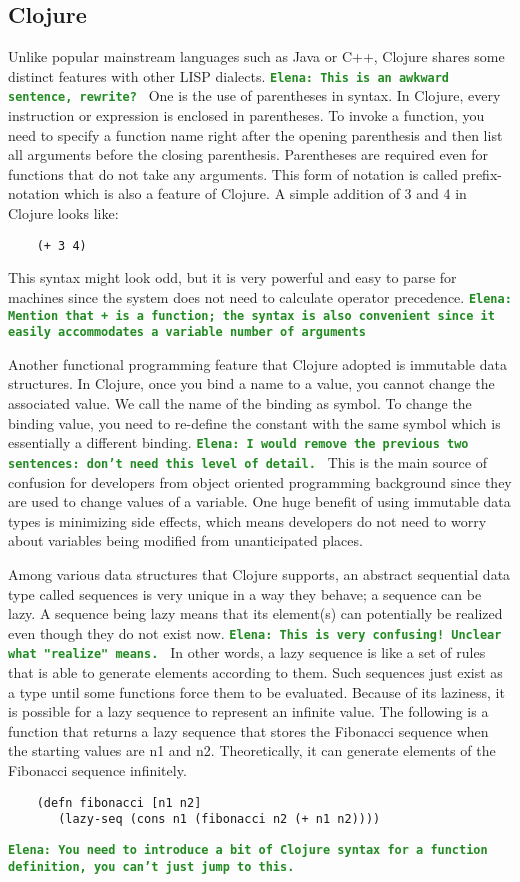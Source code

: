 \documentclass[12pt]{article}
\newcommand{\comment}[1]{{\bf \tt  {#1}}}
\newcommand{\emcomment}[1]{\textcolor{ForestGreen}{\comment{Elena: {#1}}}}
\begin{document}
	\subsection{Clojure}
	Unlike popular mainstream languages such as Java or C++, Clojure shares some distinct features with other LISP dialects. 
	\emcomment{This is an awkward sentence, rewrite? }
	One is the use of parentheses in syntax. In Clojure, every instruction or expression is enclosed in parentheses. To invoke a 
	function, you need to specify a function name right after the opening parenthesis and then list all arguments before the 
	closing parenthesis. Parentheses are required even for functions that do not take any arguments. This form of notation is 
	called prefix-notation which is also a feature of Clojure. A simple addition of 3 and 4 in Clojure looks like: 
	\begin{verbatim}
	(+ 3 4)
	\end{verbatim}
	This syntax might look odd, but it is very powerful and easy to parse for machines since the system does not need to 
	calculate operator precedence. \emcomment{Mention that + is a function; the syntax is also convenient since it easily accommodates a variable number of arguments}

	Another functional programming feature that Clojure adopted is immutable data structures. In Clojure, once you bind a 
	name to a value, you cannot change the associated value. We call the name of the binding as symbol. To change the 
	binding value, you need to re-define the constant with the same symbol which is essentially a different binding. 
	\emcomment{I would remove the previous two sentences: don't need this level of detail. }
	This is 
	the main source of confusion for developers from object oriented programming background since they are used to 
	change values of a variable. One huge benefit of using immutable data types is minimizing side effects, which means 
	developers do not need to worry about variables being modified from unanticipated places.

	Among various data structures that Clojure supports, an abstract sequential data type called sequences is very unique in 
	a way they behave; a sequence can be lazy. A sequence being lazy means that its element(s) can potentially be realized even though they do not exist now. 
	\emcomment{This is very confusing! Unclear what "realize" means. }
	In other words, a lazy sequence is like a set of rules that is able to generate elements according to them.
	Such sequences just exist as a type until some functions force them to be evaluated. Because of its laziness, it is possible 
	for a lazy sequence to represent an infinite value. The following is a function that returns a lazy sequence that stores the 
	Fibonacci sequence when the starting values are n1 and n2. Theoretically, it can generate elements of the Fibonacci 
	sequence infinitely. 
	\begin{verbatim}
	(defn fibonacci [n1 n2]
	   (lazy-seq (cons n1 (fibonacci n2 (+ n1 n2))))
	\end{verbatim}
	\emcomment{You need to introduce a bit of Clojure syntax for a function definition, you can't just jump to this.}
	
\end{document}
